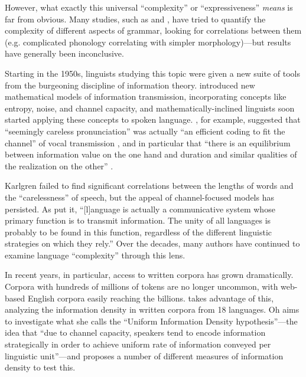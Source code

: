 \documentclass[12pt,twoside]{article}
\begin{document}

However, what exactly this universal ``complexity'' or ``expressiveness'' \emph{means} is far from obvious. Many studies, such as \citet{maddieson} and \citet{shosted}, have tried to quantify the complexity of different aspects of grammar, looking for correlations between them (e.g. complicated phonology correlating with simpler morphology)---but results have generally been inconclusive.

Starting in the 1950s, linguists studying this topic were given a new suite of tools from the burgeoning discipline of information theory. \citet{shannon} introduced new mathematical models of information transmission, incorporating concepts like entropy, noise, and channel capacity, and mathematically-inclined linguists soon started applying these concepts to spoken language. \citet{karlgren}, for example, suggested that ``seemingly careless pronunciation'' was actually ``an efficient coding to fit the channel'' of vocal transmission \citep[674]{karlgren}, and in particular that ``there is an equilibrium between information value on the one hand and duration and similar qualities of the realization on the other'' \citep[676]{karlgren}.

Karlgren failed to find significant correlations between the lengths of words and the ``carelessness'' of speech, but the appeal of channel-focused models has persisted. As \citet[539]{pellegrino} put it, ``[l]anguage is actually a communicative system whose primary function is to transmit information. The unity of all languages is probably to be found in this function, regardless of the different linguistic strategies on which they rely.'' Over the decades, many authors have continued to examine language ``complexity'' through this lens.

In recent years, in particular, access to written corpora has grown dramatically. Corpora with hundreds of millions of tokens are no longer uncommon, with web-based English corpora easily reaching the billions. \citet{oh} takes advantage of this, analyzing the information density in written corpora from 18 languages. Oh aims to investigate what she calls the ``Uniform Information Density hypothesis''---the idea that ``due to channel capacity, speakers tend to encode information strategically in order to achieve uniform rate of information conveyed per linguistic unit''---and proposes a number of different measures of information density to test this.
\end{document}
